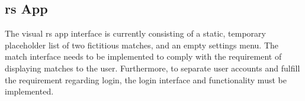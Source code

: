 \subsection{\gls{rs} App}
The visual \gls{rs} app interface is currently consisting of a static, temporary placeholder list of two fictitious matches, and an empty settings menu.
The match interface needs to be implemented to comply with the requirement of displaying matches to the user. Furthermore, to separate user accounts and fulfill the requirement regarding login, the login interface and functionality must be implemented.